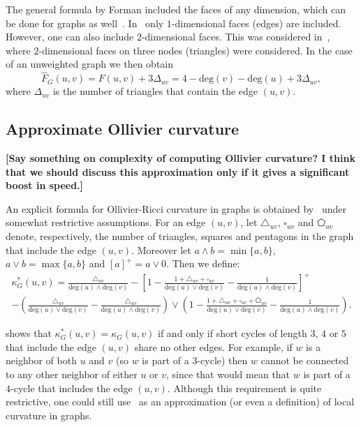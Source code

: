 \documentclass{article} %
\begin{document}
The general formula by Forman included the faces of any dimension, which can be done for graphs as well~\citep{weber2017coarse}. In~ only $1$-dimensional faces (edges) are included. However, one can also include $2$-dimensional faces. This was considered in~\cite{samal2018comparative}, where $2$-dimensional faces on three nodes (triangles) were considered. In the case of an unweighted graph we then obtain
\begin{equation}\label{eq:def_forman_curvature_triangles}
	\hat F_G(u,v) = F(u,v) + 3\Delta_{uv} 
	= 4 - \mathrm{deg}(v) - \mathrm{deg}(u) + 3\Delta_{uv},
\end{equation}
where $\Delta_{uv}$ is the number of triangles that contain the edge $(u,v)$. 

\subsection{Approximate Ollivier curvature}

\textbf{[Say something on complexity of computing Ollivier curvature? I think that we should discuss this approximation only if it gives a significant boost in speed.]}

An explicit formula for Ollivier-Ricci curvature in graphs is obtained by~\citet{kelly2019self} under somewhat restrictive assumptions. 
For an edge $(u,v)$, let $\triangle_{uv}$, $\square_{uv}$ and $\pentagon_{uv}$ denote, respectively, the number of triangles, squares and pentagons in the graph that include the edge $(u,v)$. Moreover let $a \wedge b = \min\{a,b\}$, $a \vee b = \max\{a,b\}$ and $[a]^+ = a \vee 0$. Then we define:
\begin{multline}\label{eq:def_ollivier_ricci_approx}
		\kappa_G^\ast(u,v) = \frac{\triangle_{uv}}{\mathrm{deg}(u) \wedge \mathrm{deg}(v)} 
			- \left[1 - \frac{1 + \triangle_{uv} + \square_{uv}}{\mathrm{deg}(u) \vee \mathrm{deg}(v)} - \frac{1}{\mathrm{deg}(u) \wedge \mathrm{deg}(v)}\right]^+\\
	- \left(\frac{\triangle_{uv}}{\mathrm{deg}(u) \vee \mathrm{deg}(v)} 
			- \frac{\triangle_{uv}}{\mathrm{deg}(u) \wedge \mathrm{deg}(v)}\right) \vee \left(1 - \frac{1 + \triangle_{uv} + \square_{uv} + \pentagon_{uv}}
			{\mathrm{deg}(u) \vee \mathrm{deg}(v)}
			- \frac{1}{\mathrm{deg}(u) \wedge \mathrm{deg}(v)}\right).
\end{multline}

\citet{kelly2019self} shows that $\kappa_G^\ast(u,v) = \kappa_G(u,v)$ if and only if short cycles of length $3$, $4$ or $5$ that include the edge $(u,v)$ share no other edges. For example, if $w$ is a neighbor of both $u$ and $v$ (so $w$ is part of a $3$-cycle) then $w$ cannot be connected to any other neighbor of either $u$ or $v$, since that would mean that $w$ is part of a $4$-cycle that includes the edge $(u,v)$. Although this requirement is quite restrictive, one could still use~ as an approximation (or even a definition) of local curvature in graphs.
\end{document}

